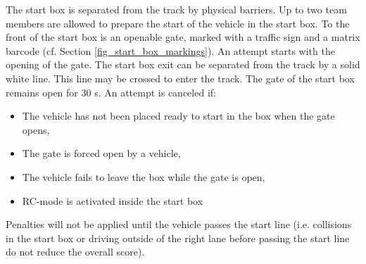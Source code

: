 The start box is separated from the track by physical barriers. Up to two team
members are allowed to prepare the start of the vehicle in the start box. To
the front of the start box is an openable gate, marked with a traffic sign and
a matrix barcode (cf. Section \ref{fig_start_box_markings}). An attempt starts
with the opening of the gate. The start box exit can be separated from the
track by a solid white line. This line may be crossed to enter the track. The
gate of the start box remains open for 30 s. An attempt is canceled if:

\begin{itemize}
	\item The vehicle has not been placed ready to start in the box when the gate opens,
	\item The gate is forced open by a vehicle,
	\item The vehicle fails to leave the box while the gate is open,
	\item RC-mode is activated inside the start box
\end{itemize}

Penalties will not be applied until the vehicle passes the start line (i.e.
collisions in the start box or driving outside of the right lane before passing
the start line do not reduce the overall score).

%
%

